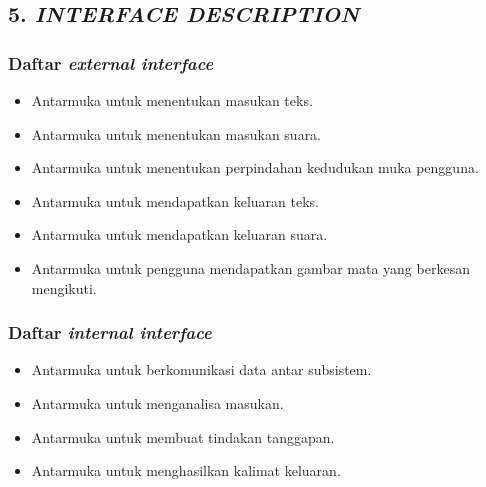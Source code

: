 \subsection*{\textcolor{subsectioncolor}{\textsf{5. \textit{INTERFACE DESCRIPTION}}}}

\subsubsection*{Daftar \textit{external interface}}
\begin{itemize}
  \item Antarmuka untuk menentukan masukan teks.
  \item Antarmuka untuk menentukan masukan suara.
  \item Antarmuka untuk menentukan perpindahan kedudukan muka pengguna.
  \item Antarmuka untuk mendapatkan keluaran teks.
  \item Antarmuka untuk mendapatkan keluaran suara.
  \item Antarmuka untuk pengguna mendapatkan gambar mata yang berkesan mengikuti.
\end{itemize}

\subsubsection*{Daftar \textit{internal interface}}
\begin{itemize}
  \item Antarmuka untuk berkomunikasi data antar subsistem.
  \item Antarmuka untuk menganalisa masukan.
  \item Antarmuka untuk membuat tindakan tanggapan.
  \item Antarmuka untuk menghasilkan kalimat keluaran.
\end{itemize}
